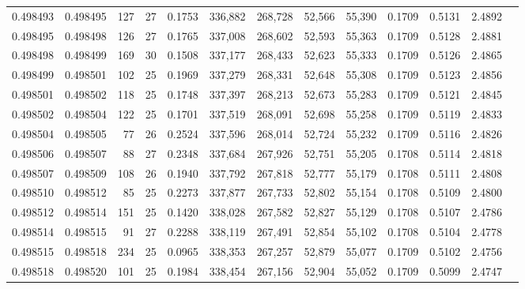 \begin{tabular}{rrrrrrrrrrrrr}
0.498493 & 0.498495 & 127 &  27 &                                     0.1753 & 336,882 & 268,728 &  52,566 &  55,390 & 0.1709 & 0.5131 & 2.4892 \\
0.498495 & 0.498498 & 126 &  27 &                                     0.1765 & 337,008 & 268,602 &  52,593 &  55,363 & 0.1709 & 0.5128 & 2.4881 \\
0.498498 & 0.498499 & 169 &  30 &                                     0.1508 & 337,177 & 268,433 &  52,623 &  55,333 & 0.1709 & 0.5126 & 2.4865 \\
0.498499 & 0.498501 & 102 &  25 &                                     0.1969 & 337,279 & 268,331 &  52,648 &  55,308 & 0.1709 & 0.5123 & 2.4856 \\
0.498501 & 0.498502 & 118 &  25 &                                     0.1748 & 337,397 & 268,213 &  52,673 &  55,283 & 0.1709 & 0.5121 & 2.4845 \\
0.498502 & 0.498504 & 122 &  25 &                                     0.1701 & 337,519 & 268,091 &  52,698 &  55,258 & 0.1709 & 0.5119 & 2.4833 \\
0.498504 & 0.498505 &  77 &  26 &                                     0.2524 & 337,596 & 268,014 &  52,724 &  55,232 & 0.1709 & 0.5116 & 2.4826 \\
0.498506 & 0.498507 &  88 &  27 &                                     0.2348 & 337,684 & 267,926 &  52,751 &  55,205 & 0.1708 & 0.5114 & 2.4818 \\
0.498507 & 0.498509 & 108 &  26 &                                     0.1940 & 337,792 & 267,818 &  52,777 &  55,179 & 0.1708 & 0.5111 & 2.4808 \\
0.498510 & 0.498512 &  85 &  25 &                                     0.2273 & 337,877 & 267,733 &  52,802 &  55,154 & 0.1708 & 0.5109 & 2.4800 \\
0.498512 & 0.498514 & 151 &  25 &                                     0.1420 & 338,028 & 267,582 &  52,827 &  55,129 & 0.1708 & 0.5107 & 2.4786 \\
0.498514 & 0.498515 &  91 &  27 &                                     0.2288 & 338,119 & 267,491 &  52,854 &  55,102 & 0.1708 & 0.5104 & 2.4778 \\
0.498515 & 0.498518 & 234 &  25 &                                     0.0965 & 338,353 & 267,257 &  52,879 &  55,077 & 0.1709 & 0.5102 & 2.4756 \\
0.498518 & 0.498520 & 101 &  25 &                                     0.1984 & 338,454 & 267,156 &  52,904 &  55,052 & 0.1709 & 0.5099 & 2.4747 \\

\end{tabular}
